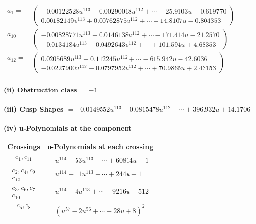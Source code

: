 \documentclass[1p]{elsarticle_modified}
\theoremstyle{definition}
\begin{document}
\begin{tabular}{m{7pt} m{180pt} m{7pt} m{180pt} }
\flushright $a_{1}=$&$\begin{pmatrix}-0.00122528 u^{113}-0.00290018 u^{112}+\cdots-25.9103 u-0.619770\\0.00182149 u^{113}+0.00762875 u^{112}+\cdots-14.8107 u-0.804353\end{pmatrix}$ \\
\flushright $a_{10}=$&$\begin{pmatrix}-0.00828771 u^{113}-0.0146138 u^{112}+\cdots-171.414 u-21.2570\\-0.0134184 u^{113}-0.0492643 u^{112}+\cdots+101.594 u+4.68353\end{pmatrix}$ \\
\flushright $a_{12}=$&$\begin{pmatrix}0.0205689 u^{113}+0.112245 u^{112}+\cdots-615.942 u-42.6036\\-0.0227900 u^{113}-0.0797952 u^{112}+\cdots+70.9865 u+2.43153\end{pmatrix}$\\&\end{tabular}
\flushleft \textbf{(ii) Obstruction class $= -1$}\\~\\
\flushleft \textbf{(iii) Cusp Shapes $= -0.0149552 u^{113}-0.0815478 u^{112}+\cdots+396.932 u+14.1706$}\\~\\
\newpage\renewcommand{\arraystretch}{1}
\flushleft \textbf{(iv) u-Polynomials at the component}\newline \\
\begin{tabular}{m{50pt}|m{274pt}}
Crossings & \hspace{64pt}u-Polynomials at each crossing \\
\hline $$\begin{aligned}c_{1},c_{11}\end{aligned}$$&$\begin{aligned}
&u^{114}+53 u^{113}+\cdots+60814 u+1
\end{aligned}$\\
\hline $$\begin{aligned}c_{2},c_{4},c_{9}\\c_{12}\end{aligned}$$&$\begin{aligned}
&u^{114}-11 u^{113}+\cdots+244 u+1
\end{aligned}$\\
\hline $$\begin{aligned}c_{3},c_{6},c_{7}\\c_{10}\end{aligned}$$&$\begin{aligned}
&u^{114}-4 u^{113}+\cdots+9216 u-512
\end{aligned}$\\
\hline $$\begin{aligned}c_{5},c_{8}\end{aligned}$$&$\begin{aligned}
&(u^{57}-2 u^{56}+\cdots-28 u+8)^{2}
\end{aligned}$\\
\hline
\end{tabular}\\~\\
\end{document}
